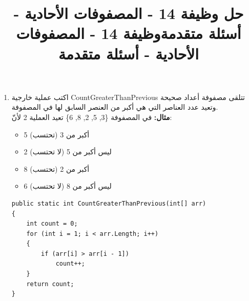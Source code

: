\documentclass[14pt]{extarticle}
\title{حل وظيفة 14 - المصفوفات الأحادية - أسئلة متقدمة}
\title{وظيفة 14 - المصفوفات الأحادية - أسئلة متقدمة}
\begin{document}
\maketitle
\thispagestyle{fancy}

\begin{enumerate}[itemsep=2em]


    \item اكتب عملية خارجية \textenglish{CountGreaterThanPrevious} تتلقى مصفوفة أعداد صحيحة وتعيد عدد العناصر التي هي أكبر من العنصر السابق لها في المصفوفة. \\
    \textbf{مثال:} في المصفوفة \textenglish{\{3, 5, 2, 8, 6\}} تعيد العملية 2 لأنّ:
    \begin{itemize}[itemsep=1pt]
        \item 5 أكبر من 3 (تحتسب)
        \item 2 ليس أكبر من 5 (لا تحتسب)
        \item 8 أكبر من 2 (تحتسب)
        \item 6 ليس أكبر من 8 (لا تحتسب)
    \end{itemize}
    \ifwithsols
    \begin{boxSolution}
    \begin{english}
    \begin{verbatim}
public static int CountGreaterThanPrevious(int[] arr)
{
    int count = 0;
    for (int i = 1; i < arr.Length; i++)
    {
        if (arr[i] > arr[i - 1])
            count++;
    }
    return count;
}
    \end{verbatim}
    \end{english}
    \end{boxSolution}
    \clearpage
    \fi


\end{enumerate}
\end{document}
